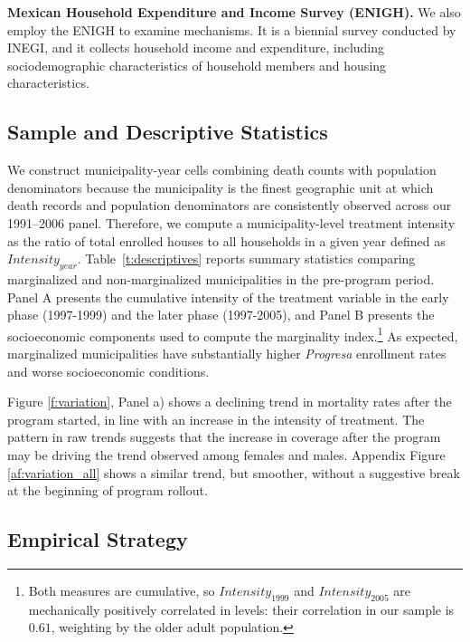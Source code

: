 \documentclass[12pt]{article}
\begin{document}
\textbf{Mexican Household Expenditure and Income Survey (ENIGH).} We also employ the ENIGH to examine mechanisms. It is a biennial survey conducted by INEGI, and it collects household income and expenditure, including  sociodemographic characteristics of household members and housing characteristics.

\subsection{Sample and Descriptive Statistics}\label{s:sample}

\p We construct municipality-year cells combining death counts with population denominators because the municipality is the finest geographic unit at which death records and population denominators are consistently observed across our 1991--2006 panel. Therefore, we compute a municipality-level treatment intensity as the ratio of total enrolled houses to all households in a given year defined as $\textit{Intensity}_{year}$. Table~\ref{t:descriptives} reports summary statistics comparing marginalized and non-marginalized municipalities in the pre-program period. Panel A presents the cumulative intensity of the treatment variable in the early phase (1997-1999) and the later phase (1997-2005), and Panel B presents the socioeconomic components used to compute the marginality index.\footnote{Both measures are cumulative, so $\textit{Intensity}_{1999}$ and $\textit{Intensity}_{2005}$ are mechanically positively correlated in levels: their correlation in our sample is $0.61$, weighting by the older adult population.} As expected, marginalized municipalities have substantially higher \textit{Progresa} enrollment rates and worse socioeconomic conditions. 

\p Figure \ref{f:variation}, Panel a) shows a declining trend in mortality rates after the program started, in line with an increase in the intensity of treatment. The pattern in raw trends suggests that the increase in coverage after the program may be driving the trend observed among females and males. Appendix Figure \ref{af:variation_all} shows a similar trend, but smoother, without a suggestive break at the beginning of program rollout.

\subsection{Empirical Strategy}\label{subsec:empirical_strategy}
\end{document}
